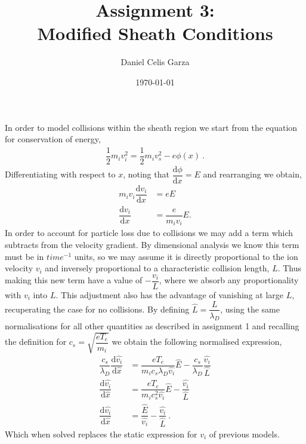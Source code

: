 \documentclass[10pt,a4paper]{article}
\begin{document}
	\title{Assignment 3:\\Modified Sheath Conditions}
	\author{Daniel Celis Garza}
	\date{\today}
	\maketitle
	
	In order to model collisions within the sheath region we start from the equation for conservation of energy,
	\begin{align}
		\dfrac{1}{2} m_{i} v_{i}^{2} = \dfrac{1}{2} m_{i} v_{s}^{2} - e \phi(x)~.
	\end{align}
	Differentiating with respect to $x$, noting that $\dfrac{\mathrm{d} \phi}{\mathrm{d} x} = E$ and rearranging we obtain,
	\begin{align}
		m_{i} v_{i} \dfrac{\mathrm{d} v_{i}}{\mathrm{d} x} &= e E \nonumber\\
		\dfrac{\mathrm{d} v_{i}}{\mathrm{d} x} &= \dfrac{e}{m_{i} v_{i}} E.
	\end{align}
	In order to account for particle loss due to collisions we may add a term which subtracts from the velocity gradient. By dimensional analysis we know this term must be in $time^{-1}$ units, so we may assume it is directly proportional to the ion velocity $v_{i}$ and inversely proportional to a characteristic collision length, $L$. Thus making this new term have a value of $-\dfrac{v_{i}}{L}$, where we absorb any proportionality with $v_{i}$ into $L$. This adjustment also has the advantage of vanishing at large $L$, recuperating the case for no collisions. By defining $\hat{L} = \dfrac{L}{\lambda_{D}}$, using the same normalisations for all other quantities as described in assignment 1 and recalling the definition for $c_{s} = \sqrt{\dfrac{e T_{e}}{m_{i}}}$ we obtain the following normalised expression,
	\begin{align}
		\dfrac{c_{s}}{\lambda_{D}} \dfrac{\mathrm{d} \hat{v_{i}}}{\mathrm{d} \hat{x}} &= \dfrac{e T_{e}}{m_{i} c_{s} \lambda_{D} \hat{v_{i}}} \hat{E} - \dfrac{c_{s}}{\lambda_{D}} \dfrac{\hat{v_{i}}}{\hat{L}} \nonumber \\
		\dfrac{\mathrm{d} \hat{v_{i}}}{\mathrm{d} \hat{x}} &= \dfrac{e T_{e}}{m_{i} c_{s}^{2} \hat{v_{i}}} \hat{E} - \dfrac{\hat{v_{i}}}{\hat{L}} \nonumber \\
		\dfrac{\mathrm{d} \hat{v_{i}}}{\mathrm{d} \hat{x}} &= \dfrac{\hat{E}}{\hat{v_{i}}} - \dfrac{\hat{v_{i}}}{\hat{L}}~.
	\end{align}
	Which when solved replaces the static expression for $v_{i}$ of previous models.
	
\end{document}
